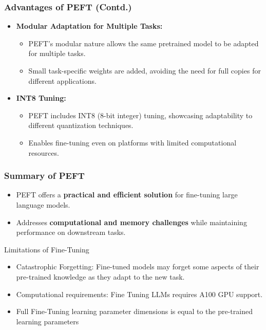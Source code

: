 \begin{frame}[fragile]\frametitle{Advantages of PEFT (Contd.)}
  \begin{itemize}
    \item \textbf{Modular Adaptation for Multiple Tasks:}
      \begin{itemize}
        \item PEFT's modular nature allows the same pretrained model to be adapted for multiple tasks.
        \item Small task-specific weights are added, avoiding the need for full copies for different applications.
      \end{itemize}
    \item \textbf{INT8 Tuning:}
      \begin{itemize}
        \item PEFT includes INT8 (8-bit integer) tuning, showcasing adaptability to different quantization techniques.
        \item Enables fine-tuning even on platforms with limited computational resources.
      \end{itemize}
  \end{itemize}
\end{frame}

\begin{frame}[fragile]\frametitle{Summary of PEFT}
  \begin{itemize}
    \item PEFT offers a \textbf{practical and efficient solution} for fine-tuning large language models.
    \item Addresses \textbf{computational and memory challenges} while maintaining performance on downstream tasks.
  \end{itemize}
\end{frame}

\begin{frame}[fragile]{Limitations of Fine-Tuning}
    \begin{itemize}
        \item Catastrophic Forgetting: Fine-tuned models may forget some aspects of their pre-trained knowledge as they adapt to the new task.
        \item Computational requirements: Fine Tuning LLMs requires A100 GPU support.
        \item Full Fine-Tuning learning parameter dimensions is equal to the pre-trained learning parameters
    \end{itemize}
\end{frame}




